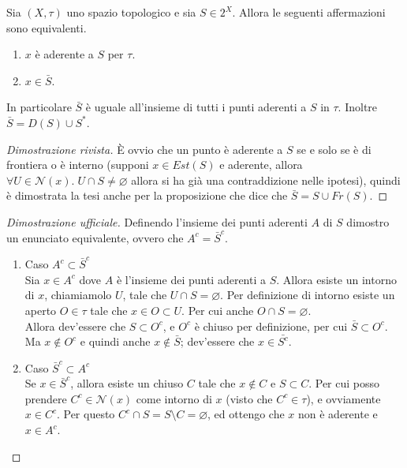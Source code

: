 \begin{theorem}
	\label{prop:aderent_points_are_in_closure}
	Sia $(X, \tau)$ uno spazio topologico e sia $S \in 2^X$. Allora le seguenti affermazioni sono equivalenti.
	\begin{enumerate}
		\item $x$ è aderente a $S$ per $\tau$.
		\item $x \in \bar{S}$. 
	\end{enumerate}
	In particolare $\bar{S}$ è uguale all'insieme di tutti i punti aderenti a $S$ in $\tau$. Inoltre $\bar{S} = D(S) \cup S^*$.
\end{theorem}
\begin{proof}[Dimostrazione rivista]
	 È ovvio che un punto è aderente a $S$ se e solo se è di frontiera o è interno (supponi $x \in Est(S)$ e aderente, allora $\forall U \in \mathcal{N}(x).\; U \cap S \neq \varnothing$ allora si ha già una contraddizione nelle ipotesi), quindi è dimostrata la tesi anche per la proposizione che dice che $\bar{S} = S \cup Fr(S)$.
\end{proof}
\begin{proof}[Dimostrazione ufficiale]
	Definendo l'insieme dei punti aderenti $A$ di $S$ dimostro un enunciato equivalente, ovvero che $A^c = \bar{S}^c$.
	\begin{enumerate}
		\item Caso $A^c \subset \bar{S}^c$ \\ Sia $x\in A^c$ dove $A$ è l'insieme dei punti aderenti a $S$. Allora esiste un intorno di $x$, chiamiamolo $U$, tale che $U \cap S = \varnothing$. Per definizione di intorno esiste un aperto $O \in \tau$ tale che $x \in O \subset U$. Per cui anche $O \cap S = \varnothing$. \\ Allora dev'essere che $S \subset O^c$,  e $O^c$ è chiuso per definizione, per cui $\bar{S} \subset O^c$. Ma $x \notin O^c$ e quindi anche $x \notin \bar{S}$; dev'essere che $x \in \bar{S^c}$.
		\item Caso $\bar{S}^c\subset A^c $ \\ Se $x \in \bar{S}^c$, allora esiste un chiuso $C$ tale che $x \notin C$ e $S \subset C$. Per cui posso prendere $C^c \in \mathcal{N}(x)$ come intorno di $x$ (visto che $C^c \in \tau$), e ovviamente $x \in C^c$. Per questo $C^c \cap S = S \setminus C = \varnothing$, ed ottengo che $x$ non è aderente e $x \in A^c$.
	\end{enumerate}
\end{proof}

